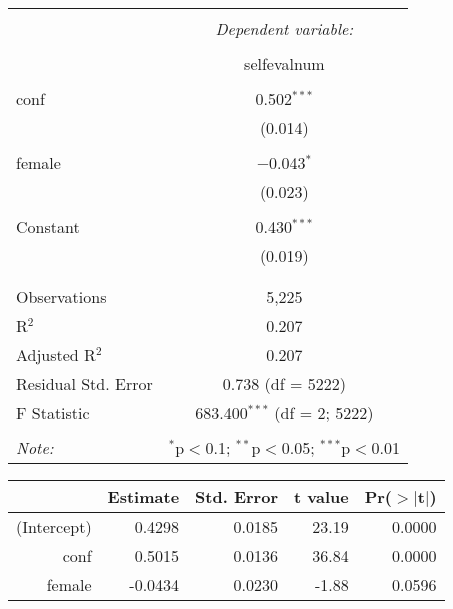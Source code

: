 \documentclass[11pt]{article} %
\title{}
\begin{document}
\maketitle


\begin{table}[!htbp] \centering 
  \caption{} 
  \label{} 
\begin{tabular}{@{\extracolsep{5pt}}lc} 
\\[-1.8ex]\hline 
\hline \\[-1.8ex] 
 & \multicolumn{1}{c}{\textit{Dependent variable:}} \\ 
\cline{2-2} 
\\[-1.8ex] & selfevalnum \\ 
\hline \\[-1.8ex] 
 conf & 0.502$^{***}$ \\ 
  & (0.014) \\ 
  & \\ 
 female & $-$0.043$^{*}$ \\ 
  & (0.023) \\ 
  & \\ 
 Constant & 0.430$^{***}$ \\ 
  & (0.019) \\ 
  & \\ 
\hline \\[-1.8ex] 
Observations & 5,225 \\ 
R$^{2}$ & 0.207 \\ 
Adjusted R$^{2}$ & 0.207 \\ 
Residual Std. Error & 0.738 (df = 5222) \\ 
F Statistic & 683.400$^{***}$ (df = 2; 5222) \\ 
\hline 
\hline \\[-1.8ex] 
\textit{Note:}  & \multicolumn{1}{r}{$^{*}$p$<$0.1; $^{**}$p$<$0.05; $^{***}$p$<$0.01} \\ 
\end{tabular} 
\end{table} 


% 
\begin{tabular}{rrrrr}
  \hline
 & Estimate & Std. Error & t value & Pr($>$$|$t$|$) \\ 
  \hline
(Intercept) & 0.4298 & 0.0185 & 23.19 & 0.0000 \\ 
  conf & 0.5015 & 0.0136 & 36.84 & 0.0000 \\ 
  female & -0.0434 & 0.0230 & -1.88 & 0.0596 \\ 
   \hline
\end{tabular}
\end{document}
